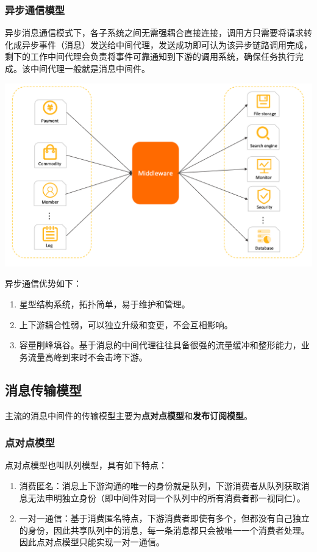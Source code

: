 \documentclass[11pt, a4paper, oneside, fontset=none]{ctexbook}
\begin{document}
\subsubsection{异步通信模型}
异步消息通信模式下，各子系统之间无需强耦合直接连接，调用方只需要将请求转化成异步事件（消息）发送给中间代理，发送成功即可认为该异步链路调用完成，剩下的工作中间代理会负责将事件可靠通知到下游的调用系统，确保任务执行完成。该中间代理一般就是消息中间件。

\begin{center}
  \begin{minipage}{\textwidth}
    \center
    \includegraphics[width=\textwidth]{picture/异步通信模型.png}
    \captionsetup{hypcap=false}
    \label{fig:异步通信模型}
  \end{minipage}
\end{center}

异步通信优势如下：
\begin{enumerate}
  \item 星型结构系统，拓扑简单，易于维护和管理。
  \item 上下游耦合性弱，可以独立升级和变更，不会互相影响。
  \item 容量削峰填谷。基于消息的中间代理往往具备很强的流量缓冲和整形能力，业务流量高峰到来时不会击垮下游。
\end{enumerate}

\subsection{消息传输模型}
主流的消息中间件的传输模型主要为{\bfseries\kaishu 点对点模型}和{\bfseries\kaishu 发布订阅模型}。
\subsubsection{点对点模型}
点对点模型也叫队列模型，具有如下特点：
\begin{enumerate}
  \item 消费匿名：消息上下游沟通的唯一的身份就是队列，下游消费者从队列获取消息无法申明独立身份（即中间件对同一个队列中的所有消费者都一视同仁）。
  \item 一对一通信：基于消费匿名特点，下游消费者即使有多个，但都没有自己独立的身份，因此共享队列中的消息，每一条消息都只会被唯一一个消费者处理。因此点对点模型只能实现一对一通信。
\end{enumerate}
\end{document}
